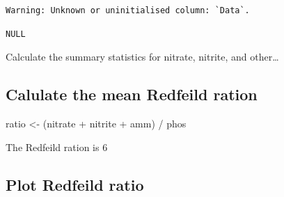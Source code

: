 \documentclass[
  letterpaper,
  DIV=11,
  numbers=noendperiod]{scrartcl}
\newenvironment{Shaded}{\begin{snugshade}}{\end{snugshade}}
\newcommand{\DocumentationTok}[1]{\textcolor[rgb]{0.37,0.37,0.37}{\textit{#1}}}
\newcommand{\FunctionTok}[1]{\textcolor[rgb]{0.28,0.35,0.67}{#1}}
\newcommand{\NormalTok}[1]{\textcolor[rgb]{0.00,0.23,0.31}{#1}}
\newcommand{\OtherTok}[1]{\textcolor[rgb]{0.00,0.23,0.31}{#1}}
\newcommand{\SpecialCharTok}[1]{\textcolor[rgb]{0.37,0.37,0.37}{#1}}
\begin{document}
\begin{Shaded}
\end{Shaded}

\begin{verbatim}
Warning: Unknown or uninitialised column: `Data`.
\end{verbatim}

\begin{verbatim}
NULL
\end{verbatim}

Calculate the summary statistics for nitrate, nitrite, and other\ldots{}

\begin{Shaded}
\end{Shaded}

\subsection{Calulate the mean Redfeild
ration}\label{calulate-the-mean-redfeild-ration}

\begin{Shaded}
\begin{Highlighting}[]
\NormalTok{ratio }\OtherTok{\textless{}{-}}\NormalTok{ (nitrate }\SpecialCharTok{+}\NormalTok{ nitrite }\SpecialCharTok{+}\NormalTok{ amm) }\SpecialCharTok{/}\NormalTok{ phos}
\end{Highlighting}
\end{Shaded}

The Redfeild ration is 6

\subsection{Plot Redfeild ratio}\label{plot-redfeild-ratio}
\end{document}
